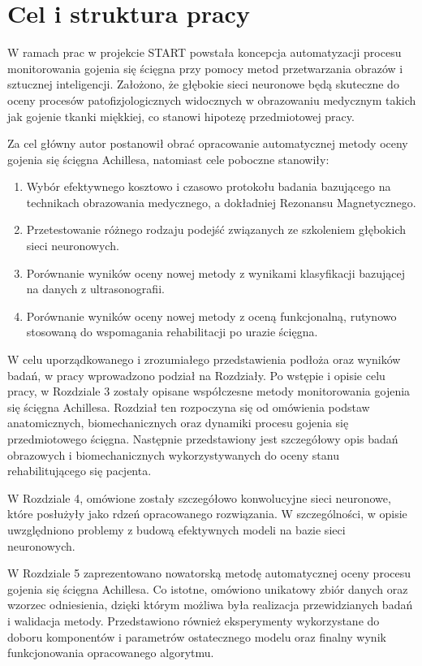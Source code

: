 \chapter{Cel i struktura pracy}

W ramach prac w projekcie START powstała koncepcja automatyzacji procesu monitorowania gojenia się ścięgna przy pomocy metod przetwarzania obrazów i sztucznej inteligencji. Założono, że głębokie sieci neuronowe będą skuteczne do oceny procesów patofizjologicznych widocznych w obrazowaniu medycznym takich jak gojenie tkanki miękkiej, co stanowi hipotezę przedmiotowej pracy.

Za cel główny autor postanowił obrać opracowanie automatycznej metody oceny gojenia się ścięgna Achillesa, natomiast cele poboczne stanowiły:
\begin{enumerate}
	\item Wybór efektywnego kosztowo i czasowo protokołu badania bazującego na technikach obrazowania medycznego, a dokładniej Rezonansu Magnetycznego.
	\item Przetestowanie różnego rodzaju podejść związanych ze szkoleniem głębokich sieci neuronowych.
	\item Porównanie wyników oceny nowej metody z wynikami klasyfikacji bazującej na danych z ultrasonografii.
	\item Porównanie wyników oceny nowej metody z oceną funkcjonalną, rutynowo stosowaną do wspomagania rehabilitacji po urazie ścięgna.
\end{enumerate}

W celu uporządkowanego i zrozumiałego przedstawienia podłoża oraz wyników badań, w pracy wprowadzono podział na Rozdziały. Po wstępie i opisie celu pracy, w Rozdziale 3 zostały opisane współczesne metody monitorowania gojenia się ścięgna Achillesa. Rozdział ten rozpoczyna się od omówienia podstaw anatomicznych, biomechanicznych oraz dynamiki procesu gojenia się przedmiotowego ścięgna. Następnie przedstawiony jest szczegółowy opis badań obrazowych i biomechanicznych wykorzystywanych do oceny stanu rehabilitującego się pacjenta. 

W Rozdziale 4, omówione zostały szczegółowo konwolucyjne sieci neuronowe, które posłużyły jako rdzeń opracowanego rozwiązania. W szczególności, w opisie uwzględniono problemy z budową efektywnych modeli na bazie sieci neuronowych. 

W Rozdziale 5 zaprezentowano nowatorską metodę automatycznej oceny procesu gojenia się ścięgna Achillesa. Co istotne, omówiono unikatowy zbiór danych oraz wzorzec odniesienia, dzięki którym możliwa była realizacja przewidzianych badań i walidacja metody. Przedstawiono również eksperymenty wykorzystane do doboru komponentów i parametrów ostatecznego modelu oraz finalny wynik funkcjonowania opracowanego algorytmu. 


